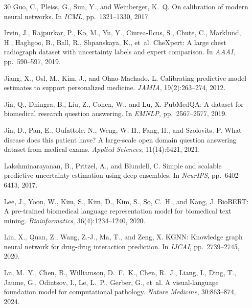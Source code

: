 \documentclass[11pt,a4paper]{article}
\begin{document}
\begin{thebibliography}{30}
Guo, C., Pleiss, G., Sun, Y., and Weinberger, K.~Q.
\newblock On calibration of modern neural networks.
\newblock In \emph{ICML}, pp.\ 1321--1330, 2017.

Irvin, J., Rajpurkar, P., Ko, M., Yu, Y., Ciurea-Ilcus, S., Chute, C., Marklund, H., Haghgoo, B., Ball, R., Shpanskaya, K., et~al.
\newblock CheXpert: A large chest radiograph dataset with uncertainty labels and expert comparison.
\newblock In \emph{AAAI}, pp.\ 590--597, 2019.

Jiang, X., Osl, M., Kim, J., and Ohno-Machado, L.
\newblock Calibrating predictive model estimates to support personalized medicine.
\newblock \emph{JAMIA}, 19(2):263--274, 2012.

Jin, Q., Dhingra, B., Liu, Z., Cohen, W., and Lu, X.
\newblock PubMedQA: A dataset for biomedical research question answering.
\newblock In \emph{EMNLP}, pp.\ 2567--2577, 2019.

Jin, D., Pan, E., Oufattole, N., Weng, W.-H., Fang, H., and Szolovits, P.
\newblock What disease does this patient have? A large-scale open domain question answering dataset from medical exams.
\newblock \emph{Applied Sciences}, 11(14):6421, 2021.

Lakshminarayanan, B., Pritzel, A., and Blundell, C.
\newblock Simple and scalable predictive uncertainty estimation using deep ensembles.
\newblock In \emph{NeurIPS}, pp.\ 6402--6413, 2017.

Lee, J., Yoon, W., Kim, S., Kim, D., Kim, S., So, C.~H., and Kang, J.
\newblock BioBERT: A pre-trained biomedical language representation model for biomedical text mining.
\newblock \emph{Bioinformatics}, 36(4):1234--1240, 2020.

Lin, X., Quan, Z., Wang, Z.-J., Ma, T., and Zeng, X.
\newblock KGNN: Knowledge graph neural network for drug-drug interaction prediction.
\newblock In \emph{IJCAI}, pp.\ 2739--2745, 2020.

Lu, M.~Y., Chen, B., Williamson, D.~F.~K., Chen, R.~J., Liang, I., Ding, T., Jaume, G., Odintsov, I., Le, L.~P., Gerber, G., et~al.
\newblock A visual-language foundation model for computational pathology.
\newblock \emph{Nature Medicine}, 30:863--874, 2024.


\end{thebibliography}
\end{document}
